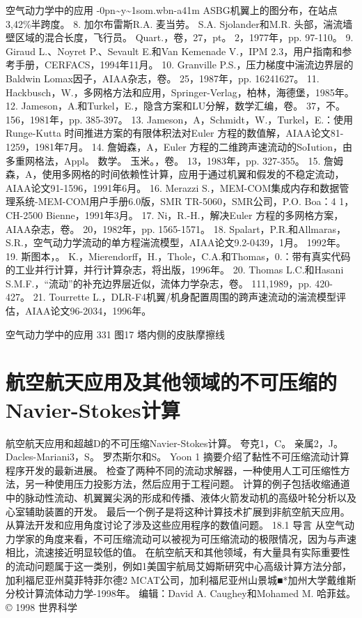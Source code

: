 \documentclass[UTF8,11pt,a4paper,openany,fontset=fandol]{ctexbook}
\begin{document}
空气动力学中的应用 -0pn\textasciitilde{}y\textasciitilde{}1som.wbn-a41m ASBG机翼上的图分布，在站点3,42\%半跨度。 8. 加尔布雷斯R.A. 麦当劳。 S.A. Sjolander和M.R. 头部，湍流墙壁区域的混合长度，飞行员。 Quart.，卷，27，pt。 2，1977年，pp. 97-110。 9. Giraud L.、Noyret P.、Sevault E.和Van Kemenade V.，IPM 2.3，用户指南和参考手册，CERFACS，1994年11月。 10. Granville P.S.，压力梯度中湍流边界层的Baldwin Lomax因子，AIAA杂志，卷。 25，1987年，pp. 16241627。 11. Hackbusch，W.，多网格方法和应用，Springer-Verlag，柏林，海德堡，1985年。 12. Jameson，A.和Turkel，E.，隐含方案和LU分解，数学汇编，卷。 37，不。 156，1981年，pp. 385-397。 13. Jameson，A，Schmidt，W.，Turkel，E.：使用Runge-Kutta 时间推进方案的有限体积法对Euler 方程的数值解，AIAA论文81-1259，1981年7月。 14. 詹姆森，A，Euler 方程的二维跨声速流动的SoIution，由多重网格法，Appl。 数学。 玉米。，卷。 13，1983年，pp. 327-355。 15. 詹姆森，A，使用多网格的时间依赖性计算，应用于通过机翼和假发的不稳定流动，AIAA论文91-1596，1991年6月。 16. Merazzi S.，MEM-COM集成内存和数据管理系统-MEM-COM用户手册6.0版，SMR TR-5060，SMR公司，P.O. Boa：4 1，CH-2500 Bienne，1991年3月。 17. Ni，R.-H.，解决Euler 方程的多网格方案，AIAA杂志，卷。 20，1982年，pp. 1565-1571。 18. Spalart，P.R.和Allmaras，S.R.，空气动力学流动的单方程湍流模型，AIAA论文9.2-0439，1月。 1992年。 19. 斯图本，。 K.，Mierendorff，H.，Thole，C.A.和Thomas，0.：带有真实代码的工业并行计算，并行计算杂志，将出版，1996年。 20. Thomas L.C.和Hasani S.M.F.，“流动”的补充边界层近似，流体力学杂志，卷。 111,1989，pp. 420-427。 21. Tourrette L.，DLR-F4机翼/机身配置周围的跨声速流动的湍流模型评估，AIAA论文96-2034，1996年。

空气动力学中的应用 331 图17 塔内侧的皮肤摩擦线

\clearpage
\chapter{航空航天应用及其他领域的不可压缩的Navier-Stokes计算}
航空航天应用和超越D的不可压缩Navier-Stokes计算。 夸克1，C。 亲属2，J。 Dacles-Mariani3，S。 罗杰斯尔和S。 Yoon 1 摘要介绍了黏性不可压缩流动计算程序开发的最新进展。 检查了两种不同的流动求解器，一种使用人工可压缩性方法，另一种使用压力投影方法，然后应用于工程问题。 计算的例子包括收缩通道中的脉动性流动、机翼翼尖涡的形成和传播、液体火箭发动机的高级叶轮分析以及心室辅助装置的开发。 最后一个例子是将这种计算技术扩展到非航空航天应用。 从算法开发和应用角度讨论了涉及这些应用程序的数值问题。 18.1 导言 从空气动力学家的角度来看，不可压缩流动可以被视为可压缩流动的极限情况，因为与声速相比，流速接近明显较低的值。 在航空航天和其他领域，有大量具有实际重要性的流动问题属于这一类别，例如1美国宇航局艾姆斯研究中心高级计算方法分部，加利福尼亚州莫菲特菲尔德2 MCAT公司，加利福尼亚州山景城■*加州大学戴维斯分校计算流体动力学-1998年。 编辑：David A. Caughey和Mohamed M. 哈菲兹。 © 1998 世界科学
\end{document}
